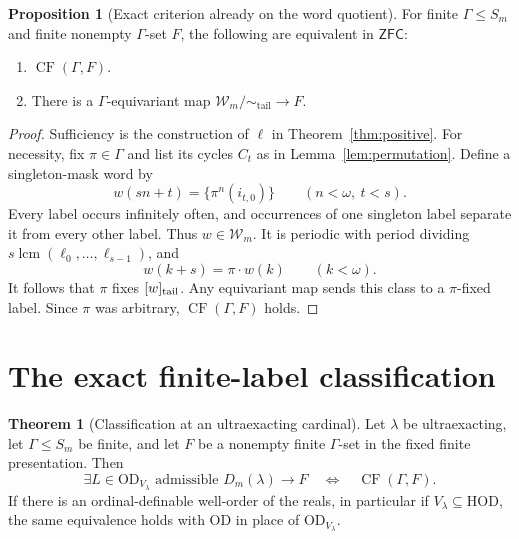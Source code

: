 \documentclass[11pt,letterpaper]{article}
\theoremstyle{definition}
\newtheorem{theorem}[definition]{Theorem}
\newtheorem{proposition}[definition]{Proposition}
\numberwithin{equation}{section}
\newcommand{\ZFC}{\mathsf{ZFC}}
\newcommand{\HOD}{\mathrm{HOD}}
\newcommand{\OD}{\mathrm{OD}}
\newcommand{\lcm}{\operatorname{lcm}}
\newcommand{\CF}{\operatorname{CF}}
\newcommand{\Tail}{\mathrel{\sim_{\mathrm{tail}}}}
\newcommand{\W}{\mathcal W}
\begin{document}
\begin{proposition}[Exact criterion already on the word quotient]\label{prop:wordcriterion}
For finite $\Gamma\le S_m$ and finite nonempty $\Gamma$-set $F$, the following are equivalent in $\ZFC$:
\begin{enumerate}
\item $\CF(\Gamma,F)$.
\item There is a $\Gamma$-equivariant map $\W_m/{\Tail}\to F$.
\end{enumerate}
\end{proposition}

\begin{proof}
Sufficiency is the construction of $\ell$ in Theorem~\ref{thm:positive}. For necessity, fix $\pi\in\Gamma$ and list its cycles $C_t$ as in Lemma~\ref{lem:permutation}. Define a singleton-mask word by
\begin{equation}\label{eq:periodicrealization}
 w(sn+t)=\{\pi^n(i_{t,0})\}
       \qquad(n<\omega,\ t<s).
\end{equation}
Every label occurs infinitely often, and occurrences of one singleton label separate it from every other label. Thus $w\in\W_m$. It is periodic with period dividing $s\lcm(\ell_0,\ldots,\ell_{s-1})$, and
\[
 w(k+s)=\pi\cdot w(k)\qquad(k<\omega).
\]
It follows that $\pi$ fixes $[w]_{\rm tail}$. Any equivariant map sends this class to a $\pi$-fixed label. Since $\pi$ was arbitrary, $\CF(\Gamma,F)$ holds.
\end{proof}

\section{The exact finite-label classification}\label{sec:classification}

\begin{theorem}[Classification at an ultraexacting cardinal]\label{thm:classification}
Let $\lambda$ be ultraexacting, let $\Gamma\le S_m$ be finite, and let $F$ be a nonempty finite $\Gamma$-set in the fixed finite presentation. Then
\begin{equation}\label{eq:classification}
 \boxed{\quad
 \exists L\in\OD_{V_\lambda}\text{ admissible }D_m(\lambda)\to F
 \quad\Longleftrightarrow\quad
 \CF(\Gamma,F).
 \quad}
\end{equation}
If there is an ordinal-definable well-order of the reals, in particular if $V_\lambda\subseteq\HOD$, the same equivalence holds with $\OD$ in place of $\OD_{V_\lambda}$.
\end{theorem}
\end{document}
